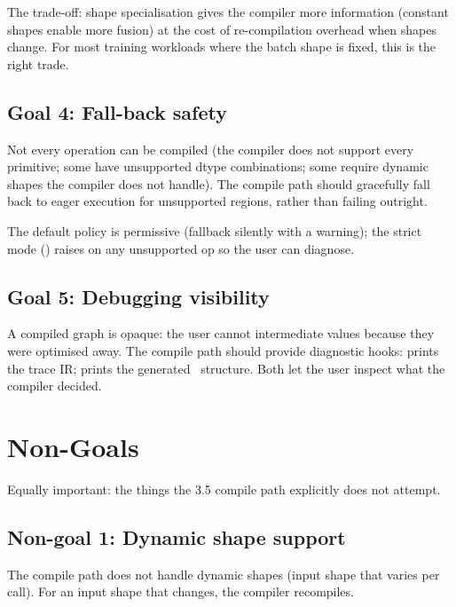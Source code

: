 The trade-off: shape specialisation gives the compiler more
information (constant shapes enable more fusion) at the cost of
re-compilation overhead when shapes change. For most training
workloads where the batch shape is fixed, this is the right
trade.

\subsection{Goal 4: Fall-back safety}
\label{ssec:compile_design:goal_fallback}

Not every operation can be compiled (the compiler does not
support every primitive; some have unsupported dtype
combinations; some require dynamic shapes the compiler does not
handle). The compile path should gracefully fall back to eager
execution for unsupported regions, rather than failing
outright.

The default policy is permissive (fallback silently with a
warning); the strict mode ()
raises on any unsupported op so the user can diagnose.

\subsection{Goal 5: Debugging visibility}
\label{ssec:compile_design:goal_debug}

A compiled graph is opaque: the user cannot 
intermediate values because they were optimised away. The
compile path should provide diagnostic hooks:
 prints the trace IR;
 prints the generated
\MPSGraph\ structure. Both let the user inspect what the
compiler decided.

\section{Non-Goals}
\label{sec:compile_design:non_goals}

Equally important: the things the 3.5 compile path explicitly
does not attempt.

\subsection{Non-goal 1: Dynamic shape support}
\label{ssec:compile_design:non_goal_dyn_shape}

The compile path does not handle dynamic shapes (input shape that
varies per call). For an input shape that changes, the compiler
recompiles.

